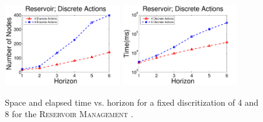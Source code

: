 \documentclass[twoside,11pt]{article}
\newcommand{\WaterReservoir}{\textsc{Reservoir Management }}
\begin{document}
\begin{figure}[tbp!]
\vspace{2mm}
\centering
\includegraphics[width=0.45\textwidth]{Figures2/camdp/DisResNode.pdf}
\includegraphics[width=0.45\textwidth]{Figures2/camdp/DisResTime.pdf}
\vspace{-2mm}
\caption{%
Space and elapsed time vs. horizon for a fixed discritization of 4 and 8 for the \WaterReservoir.}
\label{fig:resDisTS}
\vspace{-5mm}
\end{figure}
\end{document}
